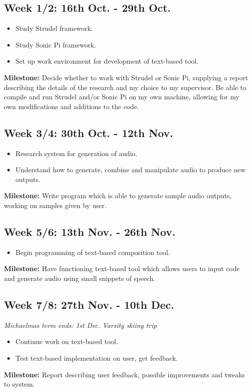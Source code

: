 \documentclass{article}
\begin{document}
\subsection*{Week 1/2: 16th Oct. - 29th Oct.}
\begin{itemize}
    \item Study Strudel framework.
    \item Study Sonic Pi framework.
    \item Set up work environment for development of text-based tool.
\end{itemize}
{
\centering\textbf{Milestone:} Decide whether to work with Strudel or Sonic Pi, supplying a report describing the details of the research and my choice to my supervisor. Be able to compile and run Strudel and/or Sonic Pi on my own machine, allowing for my own modifications and additions to the code.
}
\subsection*{Week 3/4: 30th Oct. - 12th Nov.}
\begin{itemize}
    \item Research system for generation of audio.
    \item Understand how to generate, combine and manipulate audio to produce new outputs.
\end{itemize}
{
\centering\textbf{Milestone:} Write program which is able to generate sample audio outputs, working on samples given by user.
}
\subsection*{Week 5/6: 13th Nov. - 26th Nov.}
\begin{itemize}
    \item Begin programming of text-based composition tool.
\end{itemize}
{
\centering\textbf{Milestone:} Have functioning text-based tool which allows users to input code and generate audio using small snippets of speech.
}
\subsection*{Week 7/8: 27th Nov. - 10th Dec.}
\textit{Michaelmas term ends: 1st Dec. Varsity skiing trip}
\begin{itemize}
    \item Continue work on text-based tool.
    \item Test text-based implementation on user, get feedback.
\end{itemize}
{
\centering\textbf{Milestone:} Report describing user feedback, possible improvements and tweaks to system.
}
\end{document}
